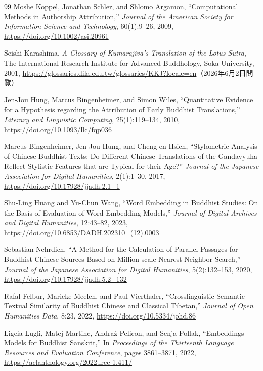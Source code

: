 \documentclass[uplatex,dvipdfmx,11pt,a4paper]{jsarticle}
\begin{document}
\begin{thebibliography}{99}
Moshe Koppel, Jonathan Schler, and Shlomo Argamon,
\newblock ``Computational Methods in Authorship Attribution,''
\newblock \textit{Journal of the American Society for Information Science and Technology}, 60(1):9--26, 2009,
\newblock \url{https://doi.org/10.1002/asi.20961}

Seishi Karashima,
\newblock \textit{A Glossary of Kumarajiva's Translation of the Lotus Sutra},
\newblock The International Research Institute for Advanced Buddhology, Soka University, 2001,
\newblock \url{https://glossaries.dila.edu.tw/glossaries/KKJ?locale=en}（2026年6月2日閲覧）

Jen-Jou Hung, Marcus Bingenheimer, and Simon Wiles,
\newblock ``Quantitative Evidence for a Hypothesis regarding the Attribution of Early Buddhist Translations,''
\newblock \textit{Literary and Linguistic Computing}, 25(1):119--134, 2010,
\newblock \url{https://doi.org/10.1093/llc/fqp036}

Marcus Bingenheimer, Jen-Jou Hung, and Cheng-en Hsieh,
\newblock ``Stylometric Analysis of Chinese Buddhist Texts: Do Different Chinese Translations of the Gandavyuha Reflect Stylistic Features that are Typical for their Age?''
\newblock \textit{Journal of the Japanese Association for Digital Humanities}, 2(1):1--30, 2017,
\newblock \url{https://doi.org/10.17928/jjadh.2.1_1}

Shu-Ling Huang and Yu-Chun Wang,
\newblock ``Word Embedding in Buddhist Studies: On the Basis of Evaluation of Word Embedding Models,''
\newblock \textit{Journal of Digital Archives and Digital Humanities}, 12:43--82, 2023,
\newblock \url{https://doi.org/10.6853/DADH.202310_(12).0003}

Sebastian Nehrdich,
\newblock ``A Method for the Calculation of Parallel Passages for Buddhist Chinese Sources Based on Million-scale Nearest Neighbor Search,''
\newblock \textit{Journal of the Japanese Association for Digital Humanities}, 5(2):132--153, 2020,
\newblock \url{https://doi.org/10.17928/jjadh.5.2_132}

Rafal Felbur, Marieke Meelen, and Paul Vierthaler,
\newblock ``Crosslinguistic Semantic Textual Similarity of Buddhist Chinese and Classical Tibetan,''
\newblock \textit{Journal of Open Humanities Data}, 8:23, 2022,
\newblock \url{https://doi.org/10.5334/johd.86}

Ligeia Lugli, Matej Martinc, Andraž Pelicon, and Senja Pollak,
\newblock ``Embeddings Models for Buddhist Sanskrit,''
\newblock In \textit{Proceedings of the Thirteenth Language Resources and Evaluation Conference}, pages 3861--3871, 2022,
\newblock \url{https://aclanthology.org/2022.lrec-1.411/}


\end{thebibliography}
\end{document}
